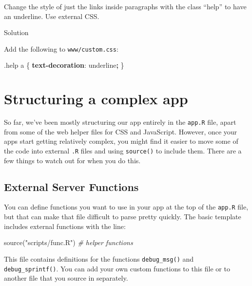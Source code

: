 \documentclass[
]{book}
\newenvironment{Shaded}{\begin{snugshade}}{\end{snugshade}}
\newcommand{\CommentTok}[1]{\textcolor[rgb]{0.56,0.35,0.01}{\textit{#1}}}
\newcommand{\DecValTok}[1]{\textcolor[rgb]{0.00,0.00,0.81}{#1}}
\newcommand{\FunctionTok}[1]{\textcolor[rgb]{0.00,0.00,0.00}{#1}}
\newcommand{\KeywordTok}[1]{\textcolor[rgb]{0.13,0.29,0.53}{\textbf{#1}}}
\newcommand{\NormalTok}[1]{#1}
\newcommand{\OperatorTok}[1]{\textcolor[rgb]{0.81,0.36,0.00}{\textbf{#1}}}
\newcommand{\StringTok}[1]{\textcolor[rgb]{0.31,0.60,0.02}{#1}}
\begin{document}
Change the style of just the links inside paragraphs with the class ``help'' to have an underline. Use external CSS.

Solution

Add the following to \texttt{www/custom.css}:

\begin{Shaded}
\begin{Highlighting}[]
\FunctionTok{.help}\NormalTok{ a \{ }\KeywordTok{text{-}decoration}\NormalTok{: }\DecValTok{underline}\OperatorTok{;}\NormalTok{ \}}
\end{Highlighting}
\end{Shaded}

\hypertarget{structure}{%
\chapter{Structuring a complex app}\label{structure}}

So far, we've been mostly structuring our app entirely in the \texttt{app.R} file, apart from some of the web helper files for CSS and JavaScript. However, once your apps start getting relatively complex, you might find it easier to move some of the code into external \texttt{.R} files and using \texttt{source()} to include them. There are a few things to watch out for when you do this.

\hypertarget{external-server-functions}{%
\section{External Server Functions}\label{external-server-functions}}

You can define functions you want to use in your app at the top of the \texttt{app.R} file, but that can make that file difficult to parse pretty quickly. The basic template includes external functions with the line:

\begin{Shaded}
\begin{Highlighting}[]
\FunctionTok{source}\NormalTok{(}\StringTok{"scripts/func.R"}\NormalTok{) }\CommentTok{\# helper functions}
\end{Highlighting}
\end{Shaded}

This file contains definitions for the functions \texttt{debug\_msg()} and \texttt{debug\_sprintf()}. You can add your own custom functions to this file or to another file that you source in separately.
\end{document}

